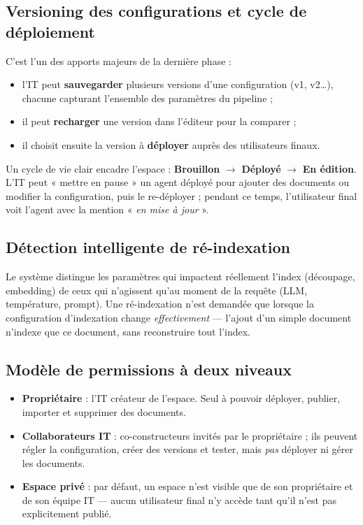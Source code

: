 \documentclass[11pt,a4paper]{article}
\begin{document}
\subsection{Versioning des configurations et cycle de déploiement}
C'est l'un des apports majeurs de la dernière phase :
\begin{itemize}
  \item l'IT peut \textbf{sauvegarder} plusieurs versions d'une configuration
        (v1, v2\ldots), chacune capturant l'ensemble des paramètres du pipeline ;
  \item il peut \textbf{recharger} une version dans l'éditeur pour la comparer ;
  \item il choisit ensuite la version à \textbf{déployer} auprès des utilisateurs
        finaux.
\end{itemize}
Un cycle de vie clair encadre l'espace : \textbf{Brouillon} $\rightarrow$
\textbf{Déployé} $\rightarrow$ \textbf{En édition}. L'IT peut « mettre en pause »
un agent déployé pour ajouter des documents ou modifier la configuration, puis le
re-déployer ; pendant ce temps, l'utilisateur final voit l'agent avec la mention
« \emph{en mise à jour} ».

\subsection{Détection intelligente de ré-indexation}
Le système distingue les paramètres qui impactent réellement l'index (découpage,
embedding) de ceux qui n'agissent qu'au moment de la requête (LLM, température,
prompt). Une ré-indexation n'est demandée que lorsque la configuration
d'indexation change \emph{effectivement} — l'ajout d'un simple document
n'indexe que ce document, sans reconstruire tout l'index.

\subsection{Modèle de permissions à deux niveaux}
\begin{itemize}
  \item \textbf{Propriétaire} : l'IT créateur de l'espace. Seul à pouvoir
        déployer, publier, importer et supprimer des documents.
  \item \textbf{Collaborateurs IT} : co-constructeurs invités par le
        propriétaire ; ils peuvent régler la configuration, créer des versions et
        tester, mais \emph{pas} déployer ni gérer les documents.
  \item \textbf{Espace privé} : par défaut, un espace n'est visible que de son
        propriétaire et de son équipe IT — aucun utilisateur final n'y accède
        tant qu'il n'est pas explicitement publié.
\end{itemize}
\end{document}
